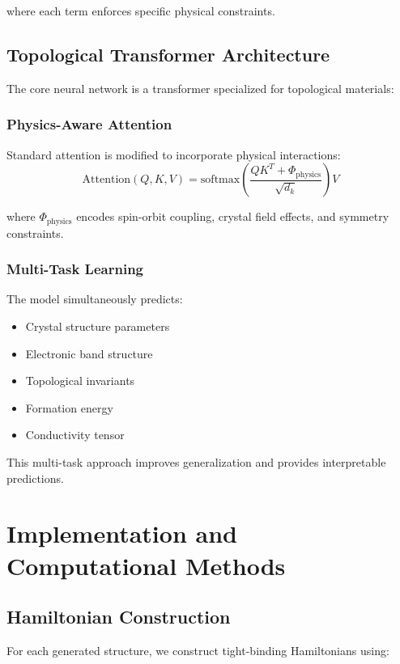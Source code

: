 \documentclass[12pt,a4paper]{article}
\begin{document}
where each term enforces specific physical constraints.

\subsection{Topological Transformer Architecture}

The core neural network is a transformer specialized for topological materials:

\subsubsection{Physics-Aware Attention}

Standard attention is modified to incorporate physical interactions:
\begin{equation}
\text{Attention}(Q, K, V) = \text{softmax}\left(\frac{QK^T + \Phi_{\text{physics}}}{\sqrt{d_k}}\right)V
\end{equation}

where $\Phi_{\text{physics}}$ encodes spin-orbit coupling, crystal field effects, and symmetry constraints.

\subsubsection{Multi-Task Learning}

The model simultaneously predicts:
\begin{itemize}
\item Crystal structure parameters
\item Electronic band structure
\item Topological invariants
\item Formation energy
\item Conductivity tensor
\end{itemize}

This multi-task approach improves generalization and provides interpretable predictions.

\section{Implementation and Computational Methods}

\subsection{Hamiltonian Construction}

For each generated structure, we construct tight-binding Hamiltonians using:
\end{document}
